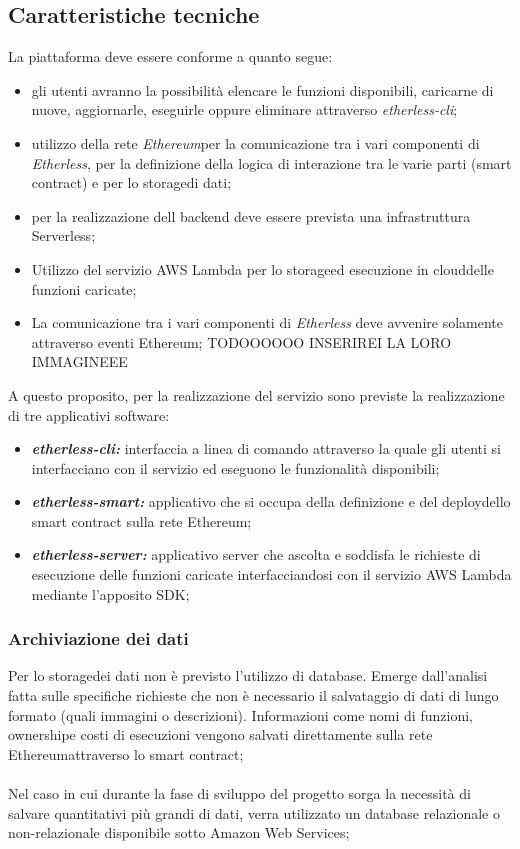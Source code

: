 \subsection{Caratteristiche tecniche}
La piattaforma deve essere conforme a quanto segue:
\begin{itemize}
	\item gli utenti avranno la possibilità elencare le funzioni disponibili,  caricarne di nuove, aggiornarle, eseguirle oppure eliminare attraverso \textit{etherless-cli};
	\item utilizzo della rete \textit{Ethereum}\glo per la comunicazione tra i vari componenti di \textit{Etherless}, per la definizione della logica di interazione tra le varie parti (smart contract\glo) e per lo storage\glo di dati;
	\item per la realizzazione dell backend deve essere prevista una infrastruttura Serverless\glo;
	\item Utilizzo del servizio AWS Lambda per lo storage\glo ed esecuzione in cloud\glo delle funzioni caricate;
	\item La comunicazione tra i vari componenti di \textit{Etherless} deve avvenire solamente attraverso eventi Ethereum\glo; TODOOOOOO INSERIREI LA LORO IMMAGINEEE

\end{itemize}
A questo proposito, per la realizzazione del servizio sono previste la realizzazione di tre applicativi software:
	\begin{itemize}
		\item \textbf{\textit{etherless-cli:}} interfaccia a linea di comando attraverso la quale gli utenti si interfacciano con il servizio ed eseguono le funzionalità disponibili;
		\item \textbf{\textit{etherless-smart:}} applicativo che si occupa della definizione e del deploy\glo dello smart contract sulla rete Ethereum;
		\item \textbf{\textit{etherless-server:}} applicativo server che ascolta e soddisfa le richieste di esecuzione delle funzioni caricate interfacciandosi con il servizio AWS Lambda mediante l'apposito SDK;
	\end{itemize}
	
\subsubsection{Archiviazione dei dati}
Per lo storage\glo dei dati non è previsto l'utilizzo di database. Emerge dall'analisi fatta sulle specifiche richieste che non è necessario il salvataggio di dati di lungo formato (quali immagini o descrizioni). Informazioni come nomi di funzioni, ownership\glo e costi di esecuzioni vengono salvati direttamente sulla rete Ethereum\glo attraverso lo smart contract\glo; 
\\\\
Nel caso in cui durante la fase di sviluppo del progetto sorga la necessità di salvare quantitativi più grandi di dati, verra utilizzato un database relazionale o non-relazionale disponibile sotto Amazon Web Services;

